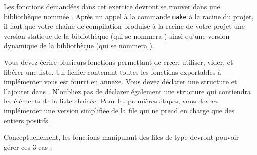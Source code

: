 

\vspace*{0.7cm}

\noindent {}

\bigskip

\noindent Les fonctions demandées dans cet exercice devront se trouver dans une bibliothèque nommée .
Après un appel à la commande \texttt{make} à la racine du projet, il faut que votre chaîne de compilation produise à la racine de votre projet une version statique de la bibliothèque (qui se nommera ) ainsi qu'une version dynamique de la bibliothèque (qui se nommera ).

\bigskip

\noindent Vous devez écrire plusieurs fonctions permettant de créer, utiliser, vider, et libérer une liste.
Un fichier  contenant toutes les fonctions exportables à implémenter vous est fourni en annexe.
Vous devez déclarer une structure  et l'ajouter dans .
N'oubliez pas de déclarer également une structure qui contiendra les éléments de la liste chaînée.
Pour les premières étapes, vous devrez implémenter une version simplifiée de la file qui ne prend en charge que des entiers positifs.

\bigskip

\noindent Conceptuellement, les fonctions manipulant des files de type  devront pouvoir gérer ces 3 cas :

\bigskip

\begin{center}
\end{center}

\newpage

